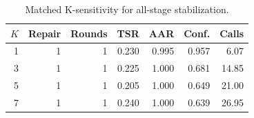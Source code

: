 \begin{table}[t]
\centering
\caption{Matched K-sensitivity for all-stage stabilization.}
\label{tab:dev-sensitivity}
\begin{tabular}{rrrrrrr}
\toprule
$K$ & Repair & Rounds & TSR & AAR & Conf. & Calls \\
\midrule
1 & 1 & 1 & 0.230 & 0.995 & 0.957 & 6.07 \\
3 & 1 & 1 & 0.225 & 1.000 & 0.681 & 14.85 \\
5 & 1 & 1 & 0.205 & 1.000 & 0.649 & 21.00 \\
7 & 1 & 1 & 0.240 & 1.000 & 0.639 & 26.95 \\
\bottomrule
\end{tabular}
\end{table}
